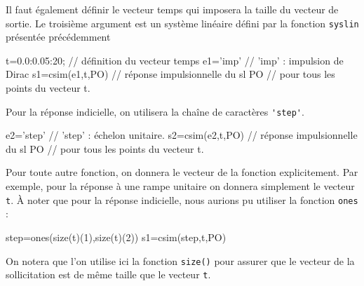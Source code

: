 Il faut également définir le vecteur temps qui imposera la 
taille du vecteur de sortie. Le troisième argument est un système linéaire
défini par la fonction \verb?syslin? présentée précédemment 
\begin{Scilabcode}
t=0.0:0.05:20;             // définition du vecteur temps 
e1='imp'                   // 'imp' : impulsion de Dirac
s1=csim(e1,t,PO)           // réponse impulsionnelle du sl PO
                           // pour tous les points du vecteur t.
\end{Scilabcode}
Pour la réponse indicielle, on utilisera la chaîne de caractères \verb?'step'?.
\begin{Scilabcode}
e2='step'                  // 'step' : échelon unitaire.
s2=csim(e2,t,PO)           // réponse impulsionnelle du sl PO
                           // pour tous les points du vecteur t.
\end{Scilabcode}
Pour toute autre fonction, on donnera le vecteur de la fonction explicitement. 
Par exemple, pour la réponse à une rampe unitaire on donnera simplement 
le vecteur \verb?t?. \`A noter que pour la réponse indicielle, nous aurions 
pu utiliser la fonction \verb?ones? :
\begin{Scilabcode}
step=ones(size(t)(1),size(t)(2))
s1=csim(step,t,PO)
\end{Scilabcode}
On notera que l'on utilise ici la fonction \verb?size()? pour assurer que le 
vecteur de la sollicitation est de même taille que le vecteur \verb?t?. 
